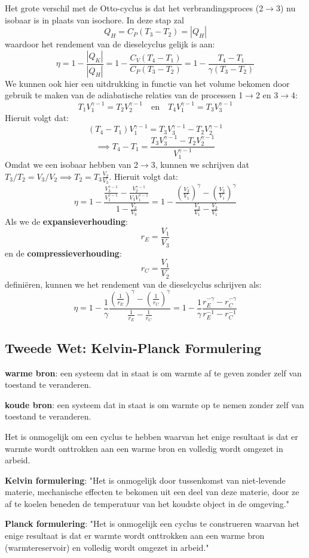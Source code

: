 Het grote verschil met de Otto-cyclus is dat het verbrandingsproces (2\(\to\)3) nu isobaar is in plaats van isochore. In deze stap zal
\[Q_H = C_P(T_3 -T_2) = |Q_H|\]
waardoor het rendement van de dieselcyclus gelijk is aan:
\[\eta = 1 - \frac{|Q_K|}{|Q_H|} = 1 - \frac{C_V(T_4-T_1)}{C_P(T_3 - T_2)} = 1 - \frac{T_4-T_1}{\gamma (T_3 - T_2)}\]
We kunnen ook hier een uitdrukking in functie van het volume bekomen door gebruik te maken van de adiabatische relaties van de processen 1\(\to\)2 en 3\(\to\)4:
\[T_1 V_1^{\gamma - 1} = T_2 V_2^{\gamma - 1} \quad \text{en} \quad T_4 V_1^{\gamma - 1} = T_3 V_3^{\gamma - 1}\]
Hieruit volgt dat:
\[(T_4-T_1)V_1^{\gamma - 1} = T_3V_3^{\gamma - 1}-T_2V_2^{\gamma - 1}\]
\[\implies T_4-T_1 = \frac{T_3V_3^{\gamma - 1}-T_2V_2^{\gamma - 1}}{V_1^{\gamma - 1}}\]
Omdat we een isobaar hebben van 2\(\to\)3, kunnen we schrijven dat \(T_3/T_2 = V_3/V_2 \implies T_2 = T_3 \frac{V_2}{V_3}\). Hieruit volgt dat:
\[\eta = 1 - \frac{\frac{V_3^{\gamma-1}}{V_1^{\gamma-1} }- \frac{V_2^{\gamma-1}}{V_3V_1^{\gamma-1}}}{1 - \frac{V_2}{V_3}}
= 1 - \frac{\left(\frac{V_3}{V_1}\right)^\gamma-\left(\frac{V_2}{V_1}\right)^{\gamma}}{\frac{V_3}{V_1}- \frac{V_2}{V_1}}\]
Als we de \textbf{expansieverhouding}:
\[r_E = \frac{V_1}{V_3} \]
en de \textbf{compressieverhouding}:
\[r_C = \frac{V_1}{V_2}\]
definiëren, kunnen we het rendement van de dieselcyclus schrijven als:
\[
\eta = 1 - \frac{1}{\gamma} \frac{(\frac{1}{r_E})^{\gamma} - (\frac{1}{r_C})^{\gamma}}{\frac{1}{r_E} - \frac{1}{r_C}}
= 1 - \frac{1}{\gamma} \frac{r_E^{-\gamma} - r_C^{-\gamma}}{r_E^{-1} - r_C^{-1}}
\]

\subsection{Tweede Wet: Kelvin-Planck Formulering}

\begin{definition}
    \textbf{warme bron}: een systeem dat in staat is om warmte af te geven zonder zelf van toestand te veranderen.
\end{definition}
\begin{definition}
    \textbf{koude bron}: een systeem dat in staat is om warmte op te nemen zonder zelf van toestand te veranderen.
\end{definition}
\begin{postulate}
    Het is onmogelijk om een cyclus te hebben waarvan het enige resultaat is dat er warmte wordt onttrokken aan een warme bron en volledig wordt omgezet in arbeid.
\end{postulate}
\begin{postulate}
    \textbf{Kelvin formulering}: "Het is onmogelijk door tussenkomst van niet-levende materie, mechanische effecten te bekomen uit een deel van deze materie, door ze af te koelen beneden de temperatuur van het koudste object in de omgeving."
\end{postulate}
\begin{postulate}
    \textbf{Planck formulering}: "Het is onmogelijk een cyclus te construeren waarvan het enige resultaat is dat er warmte wordt onttrokken aan een warme bron (warmtereservoir) en volledig wordt omgezet in arbeid."
\end{postulate}

